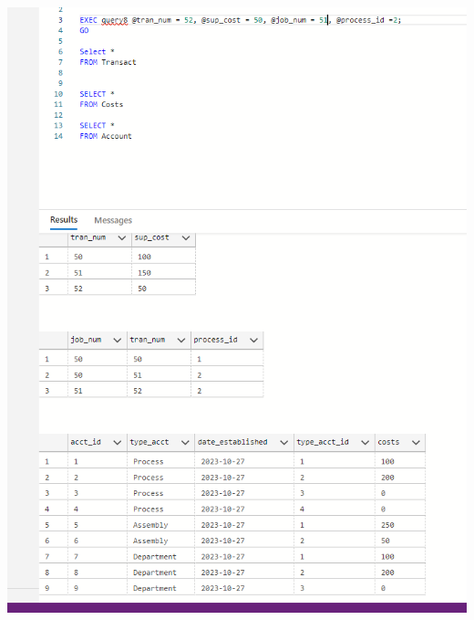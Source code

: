 \documentclass[11pt]{article}
\begin{document}
\begin{enumerate}
\includegraphics[width = \textwidth]{transact3.png}


\end{enumerate}
\end{document}
